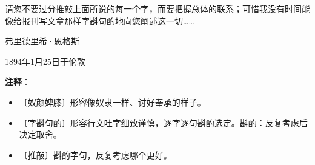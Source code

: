 \documentclass[12pt,UTF-8,openany]{ctexbook}
\begin{document}
\begin{normalsize}
    请您不要过分推敲上面所说的每一个字，而要把握总体的联系；可惜我没有时间能像给报刊写文章那样字斟句酌地向您阐述这一切……
    
    \vspace{36pt}
    
    \begin{flushright}
        弗里德里希·恩格斯
        
        1894年1月25日于伦敦
        
    \end{flushright}
    
    
    
\end{normalsize}


\newpage

\textbf{注释}：

\vspace{-1em}

\begin{itemize}
    \setlength\itemsep{-0.2em}
    \item 〔奴颜婢膝〕形容像奴隶一样、讨好奉承的样子。
    \item 〔字斟句酌〕形容行文吐字细致谨慎，逐字逐句斟酌选定。斟酌：反复考虑后决定取舍。
    \item 〔推敲〕斟酌字句，反复考虑哪个更好。
\end{itemize}
\end{document}
